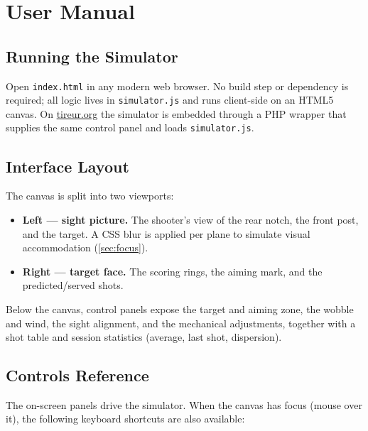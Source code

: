 \documentclass[11pt]{article}
\newcommand{\file}[1]{\texttt{#1}}
\begin{document}
\section{User Manual}\label{sec:manual}

\subsection{Running the Simulator}

Open \file{index.html} in any modern web browser. No build step or
dependency is required; all logic lives in \file{simulator.js} and runs
client-side on an HTML5 canvas. On \href{https://www.tireur.org}{tireur.org}
the simulator is embedded through a PHP wrapper that supplies the same
control panel and loads \file{simulator.js}.

\subsection{Interface Layout}\label{sec:layout}

The canvas is split into two viewports:

\begin{itemize}[nosep]
  \item \textbf{Left --- sight picture.}  The shooter's view of the rear
        notch, the front post, and the target.  A CSS blur is applied per
        plane to simulate visual accommodation (\cref{sec:focus}).
  \item \textbf{Right --- target face.}  The scoring rings, the aiming
        mark, and the predicted/served shots.
\end{itemize}

\noindent Below the canvas, control panels expose the target and aiming
zone, the wobble and wind, the sight alignment, and the mechanical
adjustments, together with a shot table and session statistics (average,
last shot, dispersion).

\subsection{Controls Reference}\label{sec:controls}

The on-screen panels drive the simulator.  When the canvas has focus
(mouse over it), the following keyboard shortcuts are also available:
\end{document}
